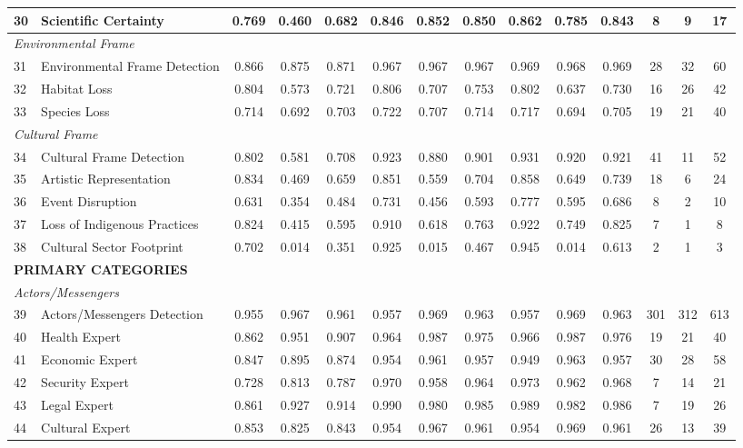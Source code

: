{\begin{longtable}{p{0.4cm}p{5.5cm}cccccccccccc}
30 & Scientific Certainty & 0.769 & 0.460 & 0.682 & 0.846 & 0.852 & 0.850 & 0.862 & 0.785 & 0.843 & 8 & 9 & 17 \\
\midrule
\multicolumn{14}{l}{\textit{Environmental Frame}} \\
31 & Environmental Frame Detection & 0.866 & 0.875 & 0.871 & 0.967 & 0.967 & 0.967 & 0.969 & 0.968 & 0.969 & 28 & 32 & 60 \\
32 & Habitat Loss & 0.804 & 0.573 & 0.721 & 0.806 & 0.707 & 0.753 & 0.802 & 0.637 & 0.730 & 16 & 26 & 42 \\
33 & Species Loss & 0.714 & 0.692 & 0.703 & 0.722 & 0.707 & 0.714 & 0.717 & 0.694 & 0.705 & 19 & 21 & 40 \\
\midrule
\multicolumn{14}{l}{\textit{Cultural Frame}} \\
34 & Cultural Frame Detection & 0.802 & 0.581 & 0.708 & 0.923 & 0.880 & 0.901 & 0.931 & 0.920 & 0.921 & 41 & 11 & 52 \\
35 & Artistic Representation & 0.834 & 0.469 & 0.659 & 0.851 & 0.559 & 0.704 & 0.858 & 0.649 & 0.739 & 18 & 6 & 24 \\
36 & Event Disruption & 0.631 & 0.354 & 0.484 & 0.731 & 0.456 & 0.593 & 0.777 & 0.595 & 0.686 & 8 & 2 & 10 \\
37 & Loss of Indigenous Practices & 0.824 & 0.415 & 0.595 & 0.910 & 0.618 & 0.763 & 0.922 & 0.749 & 0.825 & 7 & 1 & 8 \\
38 & Cultural Sector Footprint & 0.702 & 0.014 & 0.351 & 0.925 & 0.015 & 0.467 & 0.945 & 0.014 & 0.613 & 2 & 1 & 3 \\
\midrule
\multicolumn{14}{l}{\cellcolor{gray!10}\textbf{PRIMARY CATEGORIES}} \\
\midrule
\multicolumn{14}{l}{\textit{Actors/Messengers}} \\
39 & Actors/Messengers Detection & 0.955 & 0.967 & 0.961 & 0.957 & 0.969 & 0.963 & 0.957 & 0.969 & 0.963 & 301 & 312 & 613 \\
40 & Health Expert & 0.862 & 0.951 & 0.907 & 0.964 & 0.987 & 0.975 & 0.966 & 0.987 & 0.976 & 19 & 21 & 40 \\
41 & Economic Expert & 0.847 & 0.895 & 0.874 & 0.954 & 0.961 & 0.957 & 0.949 & 0.963 & 0.957 & 30 & 28 & 58 \\
42 & Security Expert & 0.728 & 0.813 & 0.787 & 0.970 & 0.958 & 0.964 & 0.973 & 0.962 & 0.968 & 7 & 14 & 21 \\
43 & Legal Expert & 0.861 & 0.927 & 0.914 & 0.990 & 0.980 & 0.985 & 0.989 & 0.982 & 0.986 & 7 & 19 & 26 \\
44 & Cultural Expert & 0.853 & 0.825 & 0.843 & 0.954 & 0.967 & 0.961 & 0.954 & 0.969 & 0.961 & 26 & 13 & 39 \\

\end{longtable}}
